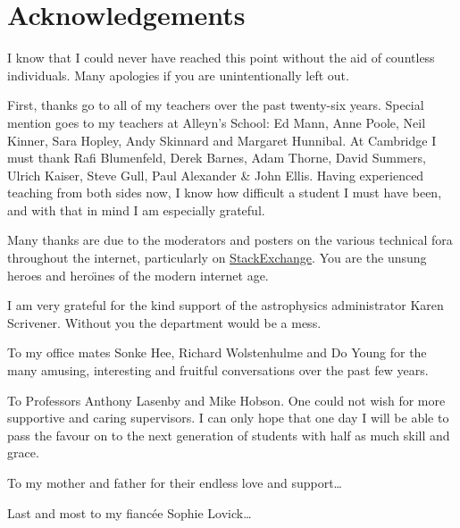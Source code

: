 \chapter*{Acknowledgements}


I know that I could never have reached this point without the aid of countless individuals. Many apologies if you are unintentionally left out.

First, thanks go to all of my teachers over the past twenty-six years. Special mention goes to my teachers at Alleyn's School: Ed Mann, Anne Poole, Neil Kinner, Sara Hopley, Andy Skinnard and Margaret Hunnibal. At Cambridge I must thank Rafi Blumenfeld, Derek Barnes, Adam Thorne, David Summers, Ulrich Kaiser, Steve Gull, Paul Alexander \& John Ellis. Having experienced teaching from both sides now, I know how difficult a student I must have been, and with that in mind I am especially grateful.

Many thanks are due to the moderators and posters on the various technical fora throughout the internet, particularly on \mbox{\href{http://stackexchange.com/}{StackExchange}}. You are the unsung heroes and hero\"{\i}nes of the modern internet age.

I am very grateful for the kind support of the astrophysics administrator Karen Scrivener. Without you the department would be a mess. 

To my office mates Sonke Hee, Richard Wolstenhulme and Do Young for the many amusing, interesting and fruitful conversations over the past few years. 

To Professors Anthony Lasenby and Mike Hobson. One could not wish for more supportive and caring supervisors. I can only hope that one day I will be able to pass the favour on to the next generation of students with half as much skill and grace.

To my mother and father for their endless love and support\ldots 

Last and most to my fianc\'{e}e Sophie Lovick\ldots  


\cleardoublepage{}
